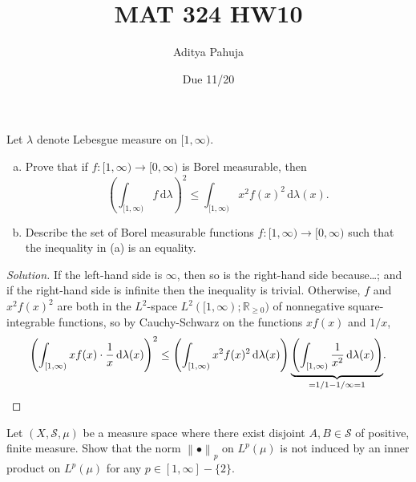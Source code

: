 \documentclass[10pt]{article}
\title{MAT 324 HW10}
\author{\large Aditya Pahuja}
\date{\large Due 11/20}
\newcommand{\dd}{\,\mathrm{d}}
\providecommand{\RR}{\mathbb R}
\providecommand{\ii}{\item}
\newenvironment{soln}{\begin{proof}[Solution]}{\end{proof}}
\providecommand{\norm}[1]{\left\| #1\right\|}
\begin{document}
\maketitle

\begin{problem}
    [Axler 8A \#17]
    Let $\lambda$ denote Lebesgue measure on $[1,\infty)$.
    \begin{enumerate}[(a)]
	\ii Prove that if $f\colon[1,\infty)\to[0,\infty)$
	is Borel measurable, then
	\begin{equation*}
	    \left(\int_{[1,\infty)}f\dd\lambda\right)^2
	    \le \int_{[1,\infty)} x^2f(x)^2\dd\lambda(x).
	\end{equation*}
	\ii Describe the set of Borel measurable functions
	$f\colon[1,\infty)\to[0,\infty)$ such that
	the inequality in (a) is an equality.
    \end{enumerate}
\end{problem}

\begin{soln}
    If the left-hand side is $\infty$, then so is the right-hand side because\dots;
    and if the right-hand side is infinite then the inequality is trivial.
    Otherwise, $f$ and $x^2 f(x)^2$ are both in
    the $L^2$-space $L^2([1,\infty); \RR_{\ge0})$
    of nonnegative square-integrable functions,
    so by Cauchy-Schwarz on the functions $xf(x)$ and $1/x$,
    \begin{equation*}
	\left(\int_{[1,\infty)} xf(x)\cdot\frac 1x\dd\lambda(x)\right)^2
	\le \left(\int_{[1,\infty)} x^2 f(x)^2\dd\lambda(x)\right)
	{\underbrace{\left(\int_{[1,\infty)}
	\frac 1{x^2}\dd\lambda(x)\right)}_{=1/1 - 1/\infty = 1}}.\qedhere
    \end{equation*}
\end{soln}

\begin{problem}
    Let $(X,\mathcal S,\mu)$ be a measure space
    where there exist disjoint $A,B\in\mathcal S$ of positive, finite measure.
    Show that the norm $\norm{\bullet}_p$ on $L^p(\mu)$ is not induced
    by an inner product on $L^p(\mu)$ for any $p\in[1,\infty]-\{2\}$.
\end{problem}
\end{document}
